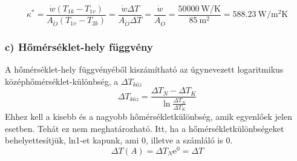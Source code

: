 \begin{equation}
\kappa^*=\dfrac{\dot{w} \left(T_{1k} - T_{1v}\right)}{A_{\ddot{O}} \left(T_{1v} - T_{2k}\right)} 
=\dfrac{\dot{w} \Delta T}{A_{\ddot{O}} \Delta T}
=\dfrac{\dot{w}}{A_{\ddot{O}}}
=\dfrac{\SI{50000}{\watt\per\kelvin}}{\SI{85}{\meter\squared}}
=\SI{588.23}{\watt\per\meter\squared\kelvin}
\end{equation}

\vspace{5mm}
\subsubsection*{c) Hőmérséklet-hely függvény}
  A hőmérséklet-hely függvényéből kiszámítható az úgynevezett  logaritmikus középhőmérséklet-különbség, a $\Delta T_{\textit{köz}}$   
\begin{equation}
\Delta T_{\textit{köz}}=\dfrac{\Delta T_N - \Delta T_K}{\ln\frac{\Delta T_N}{\Delta T_K}}
\end{equation}
Ehhez kell a kisebb és a nagyobb hőmérsékletkülönbség, amik egyenlőek jelen esetben. Tehát ez nem meghatározható. Itt, ha a hőmérsékletkülönbségeket behelyettesítjük, ln1-et kapunk, ami 0, illetve a számláló is 0.
\begin{equation}
\Delta T(A) = \Delta T_{N}\mathrm{e}^{0} = \Delta T
\end{equation}
